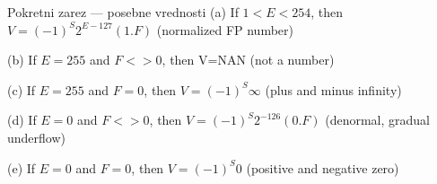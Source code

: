 \begin{frame}[label=06-s014]{Pokretni zarez — posebne vrednosti}
\setlength{\parskip}{5mm}
(a) If $1<E<254$, then $V=(-1)^S2^{E-127}(1.F)$ (normalized FP number)

(b) If $E=255$ and $F<>0$, then V=NAN (not a number)

(c) If $E=255$ and $F=0$, then $V=(-1)^S\infty$ (plus and minus infinity)

(d) If $E=0$ and $F<>0$, then $V=(-1)^S2^{-126}(0.F)$ (denormal, gradual underflow)

(e) If $E=0$ and $F=0$, then $V=(-1)^S0$ (positive and negative zero)
\end{frame}
